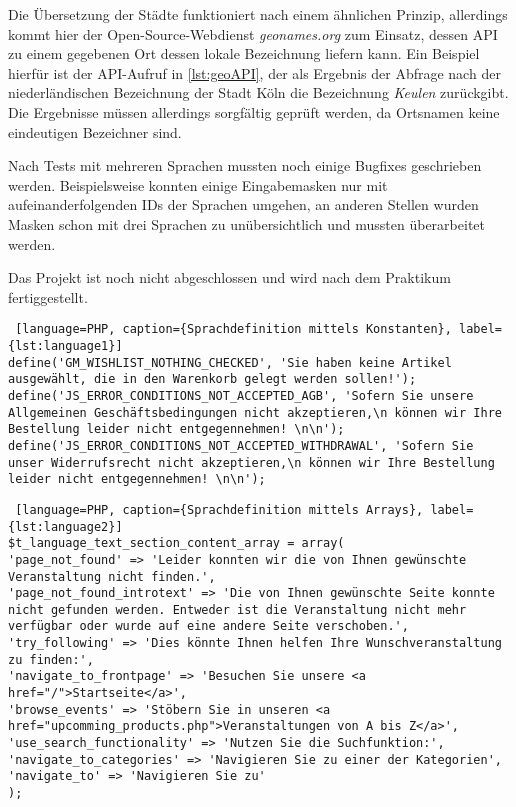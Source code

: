 Die Übersetzung der Städte funktioniert nach einem ähnlichen Prinzip, allerdings kommt hier der Open-Source-Webdienst \textit{geonames.org} zum Einsatz, 
dessen API zu einem gegebenen Ort dessen lokale Bezeichnung liefern kann. Ein Beispiel hierfür ist der API-Aufruf in \autoref{lst:geoAPI}, der als
Ergebnis der Abfrage nach der niederländischen Bezeichnung der Stadt Köln die Bezeichnung \textit{Keulen} zurückgibt. Die Ergebnisse müssen allerdings
sorgfältig geprüft werden, da Ortsnamen keine eindeutigen Bezeichner sind.

Nach Tests mit mehreren Sprachen mussten noch einige Bugfixes geschrieben werden. Beispielsweise konnten einige Eingabemasken nur mit aufeinanderfolgenden IDs der
Sprachen umgehen, an anderen Stellen wurden Masken schon mit drei Sprachen zu unübersichtlich und mussten überarbeitet werden.

Das Projekt ist noch nicht abgeschlossen und wird nach dem Praktikum fertiggestellt.

\begin{lstlisting} [language=PHP, caption={Sprachdefinition mittels Konstanten}, label={lst:language1}]
define('GM_WISHLIST_NOTHING_CHECKED', 'Sie haben keine Artikel ausgewählt, die in den Warenkorb gelegt werden sollen!');
define('JS_ERROR_CONDITIONS_NOT_ACCEPTED_AGB', 'Sofern Sie unsere Allgemeinen Geschäftsbedingungen nicht akzeptieren,\n können wir Ihre Bestellung leider nicht entgegennehmen! \n\n');
define('JS_ERROR_CONDITIONS_NOT_ACCEPTED_WITHDRAWAL', 'Sofern Sie unser Widerrufsrecht nicht akzeptieren,\n können wir Ihre Bestellung leider nicht entgegennehmen! \n\n');
\end{lstlisting}
\begin{lstlisting} [language=PHP, caption={Sprachdefinition mittels Arrays}, label={lst:language2}]
$t_language_text_section_content_array = array(
'page_not_found' => 'Leider konnten wir die von Ihnen gewünschte Veranstaltung nicht finden.',
'page_not_found_introtext' => 'Die von Ihnen gewünschte Seite konnte nicht gefunden werden. Entweder ist die Veranstaltung nicht mehr verfügbar oder wurde auf eine andere Seite verschoben.',
'try_following' => 'Dies könnte Ihnen helfen Ihre Wunschveranstaltung zu finden:',
'navigate_to_frontpage' => 'Besuchen Sie unsere <a href="/">Startseite</a>',
'browse_events' => 'Stöbern Sie in unseren <a href="upcomming_products.php">Veranstaltungen von A bis Z</a>',
'use_search_functionality' => 'Nutzen Sie die Suchfunktion:',
'navigate_to_categories' => 'Navigieren Sie zu einer der Kategorien',
'navigate_to' => 'Navigieren Sie zu'
);
\end{lstlisting}

